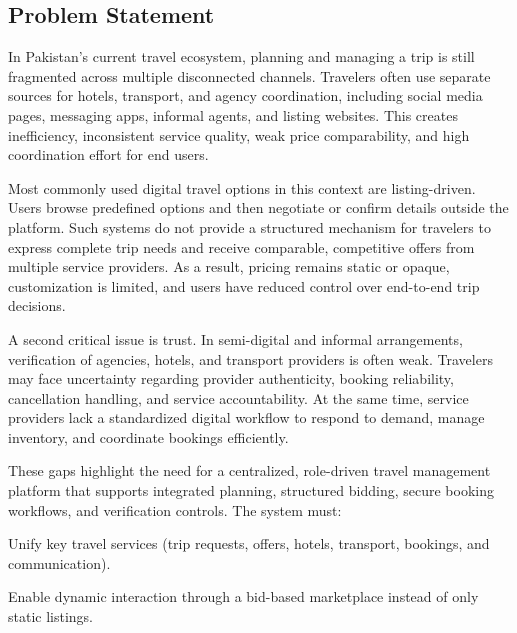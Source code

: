 \documentclass[12pt,a4paper]{article}
\newlength{\ThesisParagraphIndent}
\newcommand{\ThesisParagraph}[1]{%
  \par\begingroup
  \setlength{\leftskip}{\ThesisParagraphIndent}%
  \setlength{\parindent}{0pt}%
  \noindent#1\par
  \endgroup}
\begin{document}
\subsection{Problem Statement}

\ThesisParagraph{In Pakistan's current travel ecosystem, planning and managing a trip is still fragmented across multiple disconnected channels. Travelers often use separate sources for hotels, transport, and agency coordination, including social media pages, messaging apps, informal agents, and listing websites. This creates inefficiency, inconsistent service quality, weak price comparability, and high coordination effort for end users.}


\ThesisParagraph{Most commonly used digital travel options in this context are listing-driven. Users browse predefined options and then negotiate or confirm details outside the platform. Such systems do not provide a structured mechanism for travelers to express complete trip needs and receive comparable, competitive offers from multiple service providers. As a result, pricing remains static or opaque, customization is limited, and users have reduced control over end-to-end trip decisions.}


\ThesisParagraph{A second critical issue is trust. In semi-digital and informal arrangements, verification of agencies, hotels, and transport providers is often weak. Travelers may face uncertainty regarding provider authenticity, booking reliability, cancellation handling, and service accountability. At the same time, service providers lack a standardized digital workflow to respond to demand, manage inventory, and coordinate bookings efficiently.}


\ThesisParagraph{These gaps highlight the need for a centralized, role-driven travel management platform that supports integrated planning, structured bidding, secure booking workflows, and verification controls. The system must:}


\begin{list}{}{\setlength{\leftmargin}{\dimexpr\ThesisParagraphIndent+1.5em\relax}\setlength{\labelsep}{0.5em}\setlength{\topsep}{2pt}\setlength{\parsep}{0pt}}
\item[\textbullet] Unify key travel services (trip requests, offers, hotels, transport, bookings, and communication).
\end{list}


\begin{list}{}{\setlength{\leftmargin}{\dimexpr\ThesisParagraphIndent+1.5em\relax}\setlength{\labelsep}{0.5em}\setlength{\topsep}{2pt}\setlength{\parsep}{0pt}}
\item[\textbullet] Enable dynamic interaction through a bid-based marketplace instead of only static listings.
\end{list}
\end{document}
